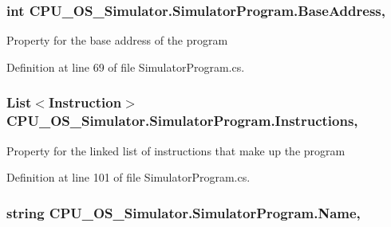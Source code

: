 \subsubsection[{Base\+Address}]{\setlength{\rightskip}{0pt plus 5cm}int C\+P\+U\+\_\+\+O\+S\+\_\+\+Simulator.\+Simulator\+Program.\+Base\+Address\hspace{0.3cm}{\ttfamily [get]}, {\ttfamily [set]}}\label{class_c_p_u___o_s___simulator_1_1_simulator_program_a568c9415fc2be2ba79154438aca2f932}


Property for the base address of the program 



Definition at line 69 of file Simulator\+Program.\+cs.

\hypertarget{class_c_p_u___o_s___simulator_1_1_simulator_program_a96c9aa54cc0d455ded271c13bc5c1bb0}{}
\subsubsection[{Instructions}]{\setlength{\rightskip}{0pt plus 5cm}List$<${\bf Instruction}$>$ C\+P\+U\+\_\+\+O\+S\+\_\+\+Simulator.\+Simulator\+Program.\+Instructions\hspace{0.3cm}{\ttfamily [get]}, {\ttfamily [set]}}\label{class_c_p_u___o_s___simulator_1_1_simulator_program_a96c9aa54cc0d455ded271c13bc5c1bb0}


Property for the linked list of instructions that make up the program 



Definition at line 101 of file Simulator\+Program.\+cs.

\hypertarget{class_c_p_u___o_s___simulator_1_1_simulator_program_a1f86d599b2126d389a1ed956f98234b3}{}
\subsubsection[{Name}]{\setlength{\rightskip}{0pt plus 5cm}string C\+P\+U\+\_\+\+O\+S\+\_\+\+Simulator.\+Simulator\+Program.\+Name\hspace{0.3cm}{\ttfamily [get]}, {\ttfamily [set]}}\label{class_c_p_u___o_s___simulator_1_1_simulator_program_a1f86d599b2126d389a1ed956f98234b3}


